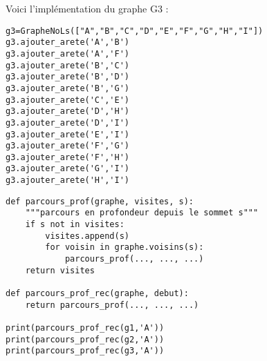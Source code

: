 \documentclass[12pt]{book}
\begin{document}
Voici l'implémentation du graphe G3 : 
\begin{lstlisting}
g3=GrapheNoLs(["A","B","C","D","E","F","G","H","I"])
g3.ajouter_arete('A','B')
g3.ajouter_arete('A','F')
g3.ajouter_arete('B','C')
g3.ajouter_arete('B','D')
g3.ajouter_arete('B','G')
g3.ajouter_arete('C','E')
g3.ajouter_arete('D','H')
g3.ajouter_arete('D','I')
g3.ajouter_arete('E','I')
g3.ajouter_arete('F','G')
g3.ajouter_arete('F','H')
g3.ajouter_arete('G','I')
g3.ajouter_arete('H','I')
\end{lstlisting}


\begin{lstlisting}
def parcours_prof(graphe, visites, s):
    """parcours en profondeur depuis le sommet s"""
    if s not in visites:
        visites.append(s)
        for voisin in graphe.voisins(s):
            parcours_prof(..., ..., ...)
    return visites

def parcours_prof_rec(graphe, debut):
    return parcours_prof(..., ..., ...)

print(parcours_prof_rec(g1,'A'))
print(parcours_prof_rec(g2,'A'))
print(parcours_prof_rec(g3,'A'))
\end{lstlisting}
%
\end{document}
